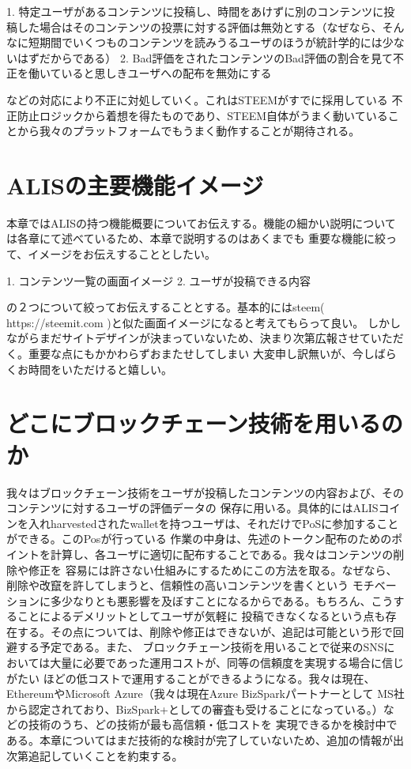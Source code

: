 \documentclass{jsarticle}
\begin{document}
1. 特定ユーザがあるコンテンツに投稿し、時間をあけずに別のコンテンツに投稿した場合はそのコンテンツの投票に対する評価は無効とする（なぜなら、そんなに短期間でいくつものコンテンツを読みうるユーザのほうが統計学的には少ないはずだからである）
2. Bad評価をされたコンテンツのBad評価の割合を見て不正を働いていると思しきユーザへの配布を無効にする

などの対応により不正に対処していく。これはSTEEMがすでに採用している
不正防止ロジックから着想を得たものであり、STEEM自体がうまく動いていることから我々のプラットフォームでもうまく動作することが期待される。
\section{ALISの主要機能イメージ}
本章ではALISの持つ機能概要についてお伝えする。機能の細かい説明については各章にて述べているため、本章で説明するのはあくまでも
重要な機能に絞って、イメージをお伝えすることとしたい。

1. コンテンツ一覧の画面イメージ
2. ユーザが投稿できる内容

の２つについて絞ってお伝えすることとする。基本的にはsteem( https://steemit.com )と似た画面イメージになると考えてもらって良い。
しかしながらまだサイトデザインが決まっていないため、決まり次第広報させていただく。重要な点にもかかわらずおまたせしてしまい
大変申し訳無いが、今しばらくお時間をいただけると嬉しい。
\section{どこにブロックチェーン技術を用いるのか}
我々はブロックチェーン技術をユーザが投稿したコンテンツの内容および、そのコンテンツに対するユーザの評価データの
保存に用いる。具体的にはALISコインを入れharvestedされたwalletを持つユーザは、それだけでPoSに参加することができる。このPosが行っている
作業の中身は、先述のトークン配布のためのポイントを計算し、各ユーザに適切に配布することである。我々はコンテンツの削除や修正を
容易には許さない仕組みにするためにこの方法を取る。なぜなら、削除や改竄を許してしまうと、信頼性の高いコンテンツを書くという
モチベーションに多少なりとも悪影響を及ぼすことになるからである。もちろん、こうすることによるデメリットとしてユーザが気軽に
投稿できなくなるという点も存在する。その点については、削除や修正はできないが、追記は可能という形で回避する予定である。また、
ブロックチェーン技術を用いることで従来のSNSにおいては大量に必要であった運用コストが、同等の信頼度を実現する場合に信じがたい
ほどの低コストで運用することができるようになる。我々は現在、EthereumやMicrosoft Azure（我々は現在Azure BizSparkパートナーとして
MS社から認定されており、BizSpark+としての審査も受けることになっている。）などの技術のうち、どの技術が最も高信頼・低コストを
実現できるかを検討中である。本章についてはまだ技術的な検討が完了していないため、追加の情報が出次第追記していくことを約束する。
\end{document}
